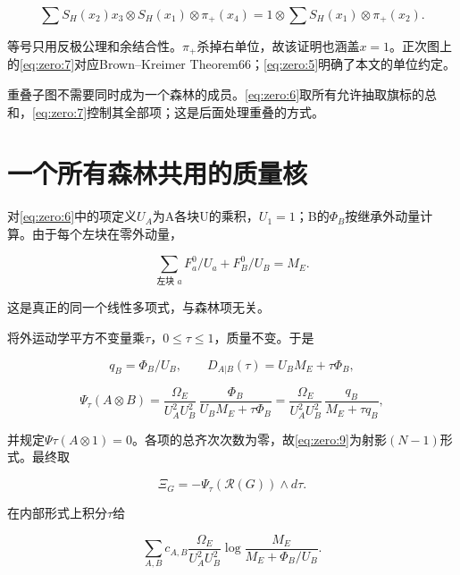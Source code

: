 \documentclass[11pt,a4paper,oneside]{ctexrep}
\theoremstyle{cnplain}
\theoremstyle{definition}
\theoremstyle{remark}
\begin{document}
\begin{equation}
\sum S_H(x_2)x_3\otimes S_H(x_1)\otimes\pi_+(x_4)
   =1\otimes\sum S_H(x_1)\otimes\pi_+(x_2).
\end{equation}

等号只用反极公理和余结合性。\(\pi _+\)杀掉右单位，故该证明也涵盖\(x=1\)。正次图上的\eqref{eq:zero:7}对应Brown--Kreimer Theorem66；\eqref{eq:zero:5}明确了本文的单位约定。

重叠子图不需要同时成为一个森林的成员。\eqref{eq:zero:6}取所有允许抽取旗标的总和，\eqref{eq:zero:7}控制其全部项；这是后面处理重叠的方式。

\section{一个所有森林共用的质量核}\label{sec:zero:4}

对\eqref{eq:zero:6}中的项定义\(U_A\)为A各块U的乘积，\(U_1=1\)；B的\(\Phi _B\)按继承外动量计算。由于每个左块在零外动量，

\begin{equation}
\sum_{\text{左块 }a}F_a^0/U_a+F_B^0/U_B=M_E.                 \label{eq:zero:8}
\end{equation}

这是真正的同一个线性多项式，与森林项无关。

将外运动学平方不变量乘\(\tau \)，\(0\le \tau \le 1\)，质量不变。于是

\begin{equation}
q_B=\Phi_B/U_B,\qquad
 D_{A|B}(\tau)=U_BM_E+\tau\Phi_B,
\end{equation}

\begin{equation}
\Psi_\tau(A\otimes B)
  =\frac{\Omega_E}{U_A^2U_B^2}\,
              \frac{\Phi_B}{U_BM_E+\tau\Phi_B}
  =\frac{\Omega_E}{U_A^2U_B^2}\,
              \frac{q_B}{M_E+\tau q_B},                       \label{eq:zero:9}
\end{equation}

并规定\(\Psi \tau (A\otimes 1)=0\)。各项的总齐次次数为零，故\eqref{eq:zero:9}为射影\((N- 1)\)形式。最终取

\begin{equation}
\Xi_G=-\Psi_\tau(\mathcal R(G))\wedge d\tau.                  \label{eq:zero:10}
\end{equation}

在内部形式上积分\(\tau \)给

\begin{equation}
\sum_{A,B}c_{A,B}\frac{\Omega_E}{U_A^2U_B^2}
              \log\frac{M_E}{M_E+\Phi_B/U_B}.                 \label{eq:zero:11}
\end{equation}
\end{document}
